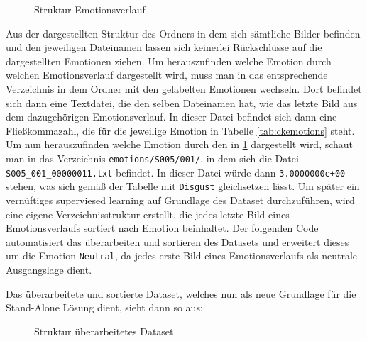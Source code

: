 \documentclass[12pt, a4paper]{scrbook}
\begin{document}
\begin{figure}
\caption{Struktur Emotionsverlauf}
\label{fig:Tree Emotionsverlauf}
\end{figure}
Aus der dargestellten Struktur des Ordners in dem sich sämtliche Bilder befinden und den jeweiligen Dateinamen lassen sich keinerlei Rückschlüsse auf die dargestellten Emotionen ziehen. Um herauszufinden welche Emotion durch welchen Emotionsverlauf dargestellt wird, muss man in das entsprechende Verzeichnis in dem Ordner mit den gelabelten Emotionen wechseln. Dort befindet sich dann eine Textdatei, die den selben Dateinamen hat, wie das letzte Bild aus dem dazugehörigen Emotionsverlauf. In dieser Datei befindet sich dann eine Fließkommazahl, die für die jeweilige Emotion in Tabelle \ref{tab:ckemotions} steht. Um nun herauszufinden welche Emotion durch den in \ref{fig:Tree Emotionsverlauf} dargestellt wird, schaut man in das Verzeichnis \texttt{emotions/S005/001/}, in dem sich die Datei \texttt{S005\_001\_00000011.txt} befindet. In dieser Datei würde dann \texttt{3.0000000e+00} stehen, was sich gemäß der Tabelle mit \texttt{Disgust} gleichsetzen lässt.\newline
Um später ein vernüftiges superviesed learning auf Grundlage des Dataset durchzuführen, wird eine eigene Verzeichnisstruktur erstellt, die jedes letzte Bild eines Emotionsverlaufs sortiert nach Emotion beinhaltet. Der folgenden Code automatisiert das überarbeiten und sortieren des Datasets und erweitert dieses um die Emotion \texttt{Neutral}, da jedes erste Bild eines Emotionsverlaufs als neutrale Ausgangslage dient.

Das überarbeitete und sortierte Dataset, welches nun als neue Grundlage für die Stand-Alone Lösung dient, sieht dann so aus:
\begin{figure}
\caption{Struktur überarbeitetes Dataset}
\label{fig:Tree Sorted Set}
\end{figure}
\end{document}
